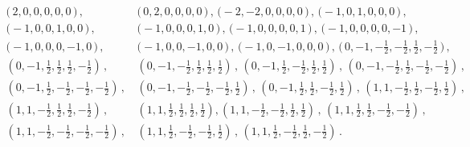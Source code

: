 \documentclass[11pt]{amsart}
\begin{document}
\begin{align*}%
\Big(\, 2, 0, 0, 0, 0, 0\,\Big) \, , \, & \Big(\,0, 2, 0, 0, 0, 0\,\Big) \, , \,
 \Big(-2, -2, 0, 0, 0, 0\,\Big)\, , \, 
 \Big(-1, 0, 1, 0, 0, 0\,\Big)\, , \, \\
  \Big(-1, 0, 0, 1, 0, 0\,\Big) \, , \,
  &
   \Big(-1, 0, 0, 0, 1, 0\,\Big)\, , \, 
   \Big(-1, 0, 0, 0, 0, 1\,\Big)\, , \,
    \Big(-1, 0, 0, 0, 0, -1\,\Big)\, , \, \\
     \Big(-1, 0, 0, 0, -1, 0\,\Big)\, , \,
     & \Big(-1, 0, 0, -1, 0, 0\,\Big)\, , \,
      \Big(-1, 0, -1, 0, 0, 0\,\Big)\, , \,
       \Big(\,0, -1, -{\frac{1}{2}}, -{\frac{1}
{2}}, {\frac{1}{2}}, -{\frac{1}{2}}\,\Big)\, , \, \\ 
 \left(0, -1, {\frac{1}{2}}, {\frac{1}{2}}, {\frac{1}{2}}, -{\frac{1}{2}}\right)\, , \,
 &
  \left(0, -1, -{\frac{1}{2}}, {\frac{1}{2}}, {\frac{1}{2}}, {\frac{1}{2}}\right)\, , \,
\left(0, -1, {\frac{1}{2}}, -{\frac{1}{2}}, {\frac{1}{2}}, {\frac{1}{2
}}\right)\, , \,
\left(0, -1, -{\frac{1}{2}}, {\frac{1}{2}}, -{\frac{1}{2}}
, -{\frac{1}{2}}\right)\, , \,\\
\left(0, -1, {\frac{1}{2}}, -{\frac{1}{2}}, -
{\frac{1}{2}}, -{\frac{1}{2}}\right)\, , \,&
%
 \left(0, -1, -{\frac{1}{2}}, -{
\frac{1}{2}}, -{\frac{1}{2}}, {\frac{1}{2}}\right)\, , \,
%
 \left(0, -1, {
\frac{1}{2}}, {\frac{1}{2}}, -{\frac{1}{2}}, {\frac{1}{2}}\right)\, , \,
%
\left(1, 1, -{\frac{1}{2}}, {\frac{1}{2}}, -{\frac{1}{2}}, {\frac{1}{2
}}\right)\, , \,
\\ 
 \left(1, 1, -{\frac{1}{2}}, {\frac{1}{2}}, {\frac{1}{2}}, -
{\frac{1}{2}}\right)
\, , \, 
&
 \left(1, 1, {\frac{1}{2}}, {\frac{1}{2}}, {\frac
{1}{2}}, {\frac{1}{2}}\right), \left(1, 1, -{\frac{1}{2}}, -{\frac{1}{
2}}, {\frac{1}{2}}, {\frac{1}{2}}\right)
\, , \,
%
 \left(1, 1, {\frac{1}{2}}, {
\frac{1}{2}}, -{\frac{1}{2}}, -{\frac{1}{2}}\right)
\, , \,
%
\\
 \left(1, 1, -{
\frac{1}{2}}, -{\frac{1}{2}}, -{\frac{1}{2}}, -{\frac{1}{2}}\right)%
\, , \,
&
\left(1, 1, {\frac{1}{2}}, -{\frac{1}{2}}, -{\frac{1}{2}}, {\frac{1}{2
}}\right)
\, , \,
%
 \left(1, 1, {\frac{1}{2}}, -{\frac{1}{2}}, {\frac{1}{2}}, -
{\frac{1}{2}}\right)\, .
\end{align*}
\end{document}
